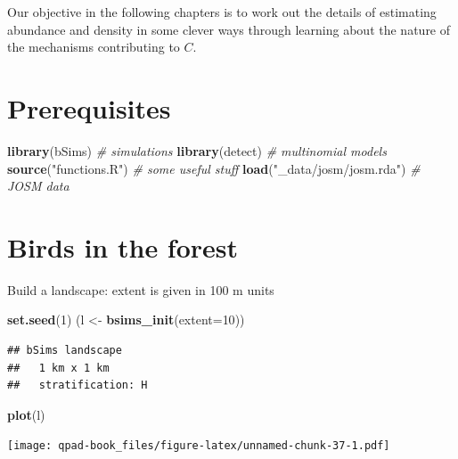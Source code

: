 \documentclass[12pt,]{book}
\newenvironment{Shaded}{\begin{snugshade}}{\end{snugshade}}
\newcommand{\CommentTok}[1]{\textcolor[rgb]{0.56,0.35,0.01}{\textit{#1}}}
\newcommand{\DataTypeTok}[1]{\textcolor[rgb]{0.13,0.29,0.53}{#1}}
\newcommand{\DecValTok}[1]{\textcolor[rgb]{0.00,0.00,0.81}{#1}}
\newcommand{\KeywordTok}[1]{\textcolor[rgb]{0.13,0.29,0.53}{\textbf{#1}}}
\newcommand{\NormalTok}[1]{#1}
\newcommand{\StringTok}[1]{\textcolor[rgb]{0.31,0.60,0.02}{#1}}
\begin{document}
Our objective in the following chapters is to work out the details of
estimating abundance and density in some clever ways through
learning about the nature of the mechanisms contributing to \(C\).

\hypertarget{prerequisites-2}{%
\section{Prerequisites}\label{prerequisites-2}}

\begin{Shaded}
\begin{Highlighting}[]
\KeywordTok{library}\NormalTok{(bSims)                }\CommentTok{# simulations}
\KeywordTok{library}\NormalTok{(detect)               }\CommentTok{# multinomial models}
\KeywordTok{source}\NormalTok{(}\StringTok{"functions.R"}\NormalTok{)         }\CommentTok{# some useful stuff}
\KeywordTok{load}\NormalTok{(}\StringTok{"_data/josm/josm.rda"}\NormalTok{) }\CommentTok{# JOSM data}
\end{Highlighting}
\end{Shaded}

\hypertarget{birds-in-the-forest}{%
\section{Birds in the forest}\label{birds-in-the-forest}}

Build a landscape: extent is given in 100 m units

\begin{Shaded}
\begin{Highlighting}[]
\KeywordTok{set.seed}\NormalTok{(}\DecValTok{1}\NormalTok{)}
\NormalTok{(l <-}\StringTok{ }\KeywordTok{bsims_init}\NormalTok{(}\DataTypeTok{extent=}\DecValTok{10}\NormalTok{))}
\end{Highlighting}
\end{Shaded}

\begin{verbatim}
## bSims landscape
##   1 km x 1 km
##   stratification: H
\end{verbatim}

\begin{Shaded}
\begin{Highlighting}[]
\KeywordTok{plot}\NormalTok{(l)}
\end{Highlighting}
\end{Shaded}

\texttt{[image: qpad-book\_files/figure-latex/unnamed-chunk-37-1.pdf]}
\end{document}
